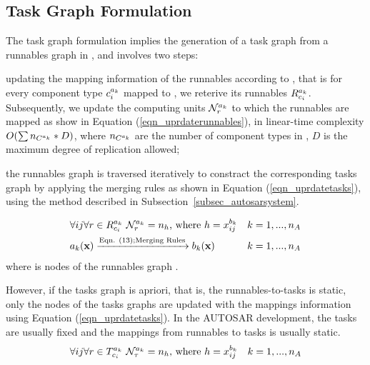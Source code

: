 \subsection{Task Graph Formulation}
The task graph formulation implies the generation of a task graph \ttat from a runnables graph \ttar in \ttx, and involves two steps: 
\begin{enumerate*}[label=(\roman*)]
	\item updating the mapping information of the runnables according to \ttx, that is for every component type $\sss{c}$ mapped to \ttx, we reterive its runnables $\sss{R}[k][c_i]$. Subsequently, we update the computing units $\sss{\mathcal{N}}[k][r]$ to which the runnables are mapped as show in Equation (\ref{eqn_uprdaterunnables}), in linear-time complexity $O(\sum n_{\ssp{C}}*D)$, where $n_{\ssp{C}}$ are the number of component types in \ttar, $D$ is the maximum degree of replication allowed;
	\item the runnables graph is traversed iteratively to constract the corresponding tasks graph by applying the merging rules as shown in Equation (\ref{eqn_uprdatetasks}), using the method described in Subsection~\ref{subsec_autosarsystem}.
\end{enumerate*}
\begin{align}
\label{eqn_uprdaterunnables}
&\forall ij\forall r\in \sss{R}[k][c_i]\ \sss{\mathcal{N}}[k][r] = n_h \mbox{, where }  h=\xkij &k=1,...,n_A\\
\label{eqn_generatetasksgraphs}
& \ar(\x)\xrightarrow{\text{Eqn. (13);Merging Rules}}\at(\x) &k=1,...,n_A
\end{align}
where \ttgr{\ar} is nodes of the runnables graph \ttar.

However, if the tasks graph is apriori, that is, the runnables-to-tasks is static, only the nodes of the tasks graphs are updated with the mappings information using Equation (\ref{eqn_uprdatetasks}). In the AUTOSAR development, the tasks are usually fixed and the mappings from runnables to tasks is usually static. 
\begin{align}
	\label{eqn_uprdatetasks}
	&\forall ij\forall r\in \sss{T}[k][c_i]\ \sss{\mathcal{N}}[k][\tau] = n_h \mbox{, where }  h=\xkij &k=1,...,n_A
\end{align}

